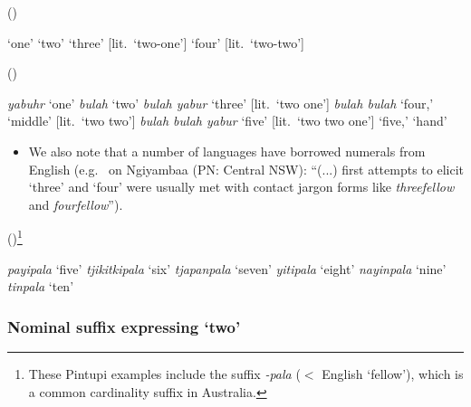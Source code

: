 \documentclass{article}
\begin{document}
    \begin{exe}
     (\citealt[47-48]{davies89})
    \begin{xlist}
  \ex  \textit{}  `one'
\ex \textit{} `two'
\ex \textit{}  `three' [lit.\ `two-one']
\ex \textit{} `four' [lit.\ `two-two']
\end{xlist}
 (\citealt[60]{sharpe98})
\begin{xlist}
\ex \textit{yabuhr} `one'
\ex \textit{bulah} `two'
\ex \textit{bulah yabur} `three' [lit.\ `two one']
\ex \textit{bulah bulah} `four,' `middle' [lit.\ `two two']
\ex \textit{bulah bulah yabur} `five' [lit.\ `two two one']
\ex \textit{} `five,' `hand'
 \end{xlist}
    \end{exe}
    
    
    \begin{itemize}
    \item We also note that a number of languages have borrowed numerals from English (e.g.\ \citet[73]{donaldson80} on Ngiyambaa (PN: Central NSW): ``(...) first attempts to elicit `three' and `four' were usually met with contact jargon forms like \textit{threefellow} and {\it fourfellow}'').
\end{itemize}

\begin{exe}
 (\citealt{pintupi77})\footnote{These Pintupi examples  include the suffix {\it -pala} ($<$ English `fellow'), which is a common cardinality suffix in Australia.} \begin{xlist}
\ex \textit{payipala} `five'
\ex \textit{tjikitkipala} `six' 
\ex \textit{tjapanpala} `seven' 
\ex \textit{yitipala} `eight' 
\ex \textit{nayinpala} `nine' 
\ex \textit{tinpala} `ten' 
\end{xlist}
\end{exe}




\subsubsection{Nominal suffix expressing `two'}
\end{document}
